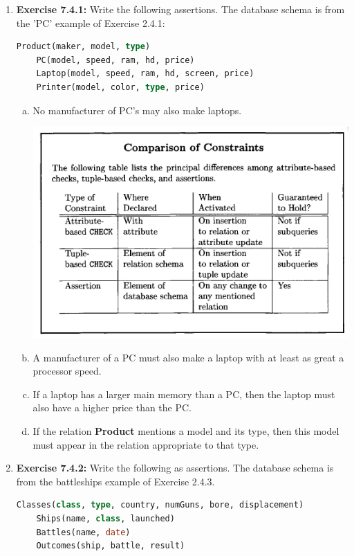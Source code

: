 \documentclass[12pt]{article}
\begin{document}
\begin{enumerate}[1.]
    \item \textbf{Exercise 7.4.1:} Write the following assertions. The database schema is from
    the 'PC' example of Exercise 2.4.1:


    \begin{lstlisting}[language=SQL]
    Product(maker, model, type)
    PC(model, speed, ram, hd, price)
    Laptop(model, speed, ram, hd, screen, price)
    Printer(model, color, type, price)
    \end{lstlisting}

    \bigskip

    \begin{enumerate}[a)]
        \item No manufacturer of PC's may also make laptops.

        \begin{center}
        \includegraphics[width=0.7\linewidth]{images/worksheet_5_1.png}
        \end{center}

        \item A manufacturer of a PC must also make a laptop with at least as great a processor speed.
        \item If a laptop has a larger main memory than a PC, then the laptop must also have a higher price than the PC.
        \item If the relation \textbf{Product} mentions a model and its type, then this model must appear in the relation appropriate to that type.
    \end{enumerate}

    \item \textbf{Exercise 7.4.2:} Write the following as assertions. The
    database schema is from the battleships example of Exercise 2.4.3.

    \bigskip

    \begin{lstlisting}[language=SQL]
    Classes(class, type, country, numGuns, bore, displacement)
    Ships(name, class, launched)
    Battles(name, date)
    Outcomes(ship, battle, result)
    \end{lstlisting}


\end{enumerate}
\end{document}
